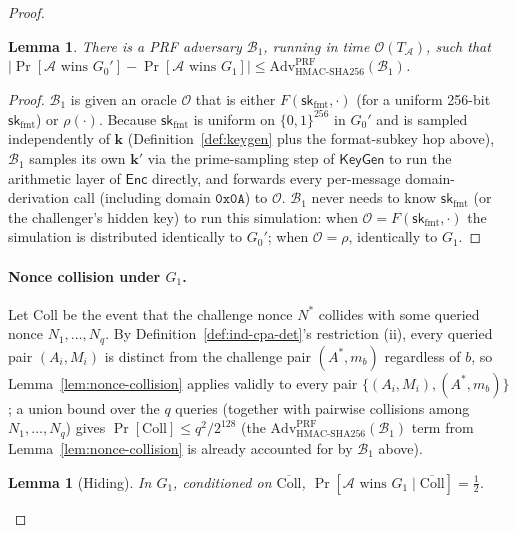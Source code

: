 \documentclass[11pt,a4paper]{article}
\newtheorem{lemma}[theorem]{Lemma}
\begin{document}
\begin{proof}
\begin{lemma}\label{lem:prf-hop}
There is a PRF adversary $\mathcal{B}_1$, running in time
$\mathcal{O}(T_\mathcal{A})$, such that
$|\Pr[\mathcal{A}\text{ wins }G_0']-\Pr[\mathcal{A}\text{ wins }G_1]|\le\mathrm{Adv}^{\mathrm{PRF}}_{\mathrm{HMAC\text{-}SHA256}}(\mathcal{B}_1)$.
\end{lemma}
\begin{proof}
$\mathcal{B}_1$ is given an oracle $\mathcal{O}$ that is either
$F(\mathsf{sk}_{\mathrm{fmt}},\cdot)$ (for a uniform 256-bit
$\mathsf{sk}_{\mathrm{fmt}}$) or $\rho(\cdot)$. Because
$\mathsf{sk}_{\mathrm{fmt}}$ is uniform on $\{0,1\}^{256}$ in $G_0'$ and
is sampled independently of $\mathbf{k}$ (Definition~\ref{def:keygen}
plus the format-subkey hop above), $\mathcal{B}_1$ samples its own
$\mathbf{k}'$ via the prime-sampling step of $\mathsf{KeyGen}$ to run
the arithmetic layer of $\mathsf{Enc}$ directly, and forwards every
per-message domain-derivation call (including domain $\texttt{0x0A}$) to
$\mathcal{O}$. $\mathcal{B}_1$ never needs to know
$\mathsf{sk}_{\mathrm{fmt}}$ (or the challenger's hidden key) to run
this simulation: when $\mathcal{O}=F(\mathsf{sk}_{\mathrm{fmt}},\cdot)$
the simulation is distributed identically to $G_0'$; when
$\mathcal{O}=\rho$, identically to $G_1$.
\end{proof}

\paragraph{Nonce collision under $G_1$.} Let $\mathrm{Coll}$ be the event
that the challenge nonce $N^*$ collides with some queried nonce
$N_1,\ldots,N_q$. By Definition~\ref{def:ind-cpa-det}'s restriction (ii),
every queried pair $(A_i,M_i)$ is distinct from the challenge pair
$(A^*,m_b)$ regardless of $b$, so Lemma~\ref{lem:nonce-collision} applies
validly to every pair $\{(A_i,M_i),(A^*,m_b)\}$; a union bound over the $q$
queries (together with pairwise collisions among $N_1,\ldots,N_q$) gives
$\Pr[\mathrm{Coll}]\le q^2/2^{128}$ (the $\mathrm{Adv}^{\mathrm{PRF}}_{\mathrm{HMAC\text{-}SHA256}}(\mathcal{B}_1)$
term from Lemma~\ref{lem:nonce-collision} is already accounted for by
$\mathcal{B}_1$ above).

\begin{lemma}[Hiding]\label{lem:hiding}
In $G_1$, conditioned on $\overline{\mathrm{Coll}}$,
$\Pr[\mathcal{A}\text{ wins }G_1\mid\overline{\mathrm{Coll}}]=\tfrac12$.
\end{lemma}


\end{proof}
\end{document}
